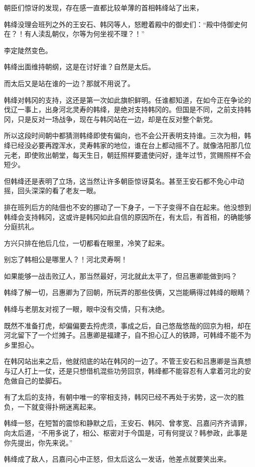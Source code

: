 朝臣们惊讶的发现，存在感一直都比较单薄的首相韩绛站了出来，

韩绛没理会班列之外的王安石、韩冈等人，怒瞪着殿中的御史们：“殿中侍御史何在？！有人渎乱朝仪，尔等为何坐视不理？！”

李定陡然变色。

韩绛出面维持朝纲，这是在讨好谁？自然是太后。

而太后又是站在谁的一边？那就不用说了。

韩绛对韩冈的支持，这还是第一次如此旗帜鲜明。任谁都知道，在如今正在争论的伐辽一事上，出身河北灵寿的韩绛，是绝对支持韩冈的。但国是不同，之前支持韩冈，只是反对一场战争，现在与韩冈站在一边，却是在反对整个新党。

所以这段时间朝中都猜测韩绛即使有偏向，也不会公开表明支持谁。三次为相，韩绛已经没必要再蹚浑水，灵寿韩家的地位，谁在台上都动摇不了。就像洛阳那几位元老，即使败出朝堂，每天生日，朝廷照样要遣使问好，逢年过节，赏赐照样不会短少。

但韩绛还是表明了立场，这当然让许多朝臣惊讶莫名。甚至王安石都不免心中动摇，回头深深的看了老友一眼。

排在班列后方的陆佃也不安的挪动了一下身子，一下子变得不自在起来。他没想到韩绛会支持韩冈，这或许是韩冈如此自信的原因所在，有太后，有首相，的确能够分庭抗礼。

方兴只排在他后几位，一切都看在眼里，冷笑了起来。

别忘了韩相公是哪里人？！河北灵寿啊！

如果能够一战击败辽人，那当然最好，河北就此太平了，但吕惠卿能做到吗？

韩绛了解一切，吕惠卿为了回朝，所玩弄的那些伎俩，又岂能瞒得过韩绛的眼睛？

韩绛与老朋友对视了一眼，眼中没有交情，只有决绝。

既然不准备打虎，却偏偏要去捋虎须，事成之后，自己悠哉悠哉的回京为相，却在河北留下了一个烂摊子。吕惠卿是福建子，自不担心辽人的铁蹄，可韩绛不能不为乡里担心。

在韩冈站出来之后，他就彻底的站在韩冈的一边了。不管王安石和吕惠卿是当真想与辽人打上一仗，还是只想借机混些功劳回京，韩绛都不能容忍有人拿着河北的安危做自己的垫脚石。

有了太后的支持，有朝中唯一的宰相支持，韩冈已经不再处于劣势，这一次的胜负，一下就变得扑朔迷离起来。

韩绛一怒，在短暂的震惊和静默之后，王安石、韩冈、曾孝宽、吕嘉问齐齐请罪，向太后道，“不用多说了，相公、枢密对于今国是，可有何提议？韩参政，此事是你先提出，你先来说。”

韩绛成了敌人，吕嘉问心中正怒，但太后这么一发话，他差点就要笑出来。

